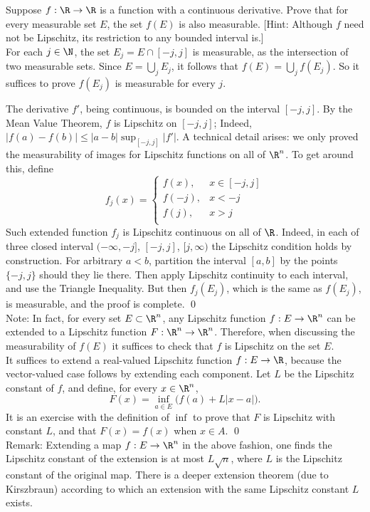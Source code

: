\begin{hwsol}
Suppose $f: \R \to \R$ is a function with a continuous derivative. Prove that for every measurable set $E$, the set $f(E)$ is also measurable. [Hint: Although $f$ need not be Lipschitz, its restriction to any bounded interval is.] \\

\pf For each $j \in \N$, the set $E_j= E \cap [-j, j]$ is measurable, as the intersection of two measurable sets. Since $E=\bigcup_j E_j$, it follows that $f(E)=\bigcup_j f(E_j)$. So it suffices to prove $f(E_j)$ is measurable for every $j$.

The derivative $f'$, being continuous, is bounded on the interval $[-j, j]$. By the Mean Value Theorem, $f$ is Lipschitz on $[-j, j]$; Indeed, $|f(a)-f(b)| \leq |a-b| \sup_{[-j, j]} |f'|$. A technical detail arises: we only proved the measurability of images for Lipschitz functions on all of $\R^n$. To get around this, define 
        \[
        f_j(x)= 
        \begin{cases} 
        f(x), & x\in [-j, j] \\ 
        f(-j), & x < -j  \\ 
        f(j), & x> j  \\ 
        \end{cases}
        \]
Such extended function $f_j$ is Lipschitz continuous on all of $\R$. Indeed, in each of three closed interval $(-\infty, -j]$, $[-j, j]$, $[j, \infty)$ the Lipschitz condition holds by construction. For arbitrary $a<b$, partition the interval $[a, b]$ by the points $\{ -j, j \}$ should they lie there. Then apply Lipschitz continuity to each interval, and use the Triangle Inequality. But then $f_j(E_j)$, which is the same as $f(E_j)$, is measurable, and the proof is complete. \qed \\

\noindent Note: In fact, for every set $E \subset \R^n$, any Lipschitz function $f: E \to \R^n$ can be extended to a Lipschitz function $F: \R^n \to \R^n$. Therefore, when discussing the measurability of $f(E)$ it suffices to check that $f$ is Lipschitz on the set $E$. \\

\pfsk It suffices to extend a real-valued Lipschitz function $f: E \to \R$, because the vector-valued case follows by extending each component. Let $L$ be the Lipschitz constant of $f$, and define, for every $x \in \R^n$,
        \[
        F(x) = \inf_{a \in E} \big( f(a) + L |x-a| \big).
        \]
It is an exercise with the definition of $\inf$ to prove that $F$ is Lipschitz with constant $L$, and that $F(x)=f(x)$ when $x \in A$. \qed \\

\noindent Remark: Extending a map $f: E \to \R^n$ in the above fashion, one finds the Lipschitz constant of the extension is at most $L \sqrt{n}$, where $L$ is the Lipschitz constant of the original map. There is a deeper extension theorem (due to Kirszbraun) according to which an extension with the same Lipschitz constant $L$ exists. \\
\end{hwsol}


